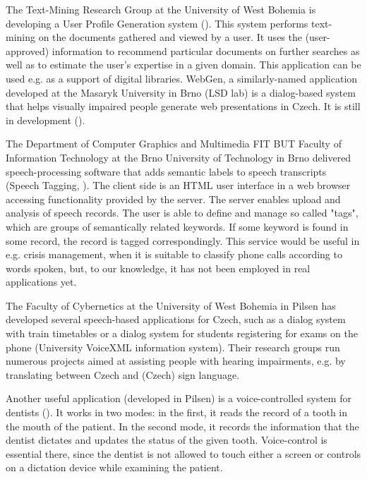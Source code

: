 \documentclass[]{../../metanetpaper}
\begin{document}
\begin{multicols}{2}
The Text-Mining Research Group at the University of West Bohemia is developing a User Profile Generation system (\cite{Grolmus2003}). This system performs text-mining on the documents gathered and viewed by a user. It uses the (user-approved) information to recommend particular documents on further searches as well as to estimate the user’s expertise in a given domain. This application can be used e.g. as a support of digital libraries.
WebGen, a similarly-named application developed at the Masaryk University in Brno (LSD lab\cite{Note22}) is a dialog-based system that helps visually impaired people generate web presentations in Czech. It is still in development (\cite{BartelPlhak2008}).

The Department of Computer Graphics and Multimedia FIT BUT Faculty of Information Technology at the Brno University of Technology in Brno\cite{Note23} delivered speech-processing software that adds semantic labels to speech transcripts (Speech Tagging, \cite{Smrz2010}). The client side is an HTML user interface in a web browser accessing functionality provided by the server. The server enables upload and analysis of speech records. The user is able to define and manage so called "tags", which are groups of semantically related keywords. If some keyword is found in some record, the record is tagged correspondingly. This service would be useful in e.g. crisis management, when it is suitable to classify phone calls according to words spoken, but, to our knowledge, it has not been employed in real applications yet.

The Faculty of Cybernetics at the University of West Bohemia in Pilsen has developed several speech-based applications for Czech, such as a dialog system with train timetables or a dialog system for students registering for exams on the phone (University VoiceXML information system\cite{Note24}). Their research groups run numerous projects aimed at assisting people with hearing impairments, e.g. by translating between Czech and (Czech) sign language.

Another useful application (developed in Pilsen) is a voice-controlled system for dentists (\cite{Nagy2008}). It works in two modes:  in the first, it reads the record of a tooth in the mouth of the patient. In the second mode, it records the information that the dentist dictates and updates the status of the given tooth. Voice-control is essential there, since the dentist is not allowed to touch either a screen or controls on a dictation device while examining the patient.


\end{multicols}
\end{document}
